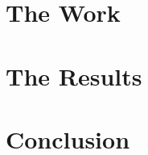 \documentclass{esda}
\begin{document}
\cleardoublepage
\section{The Work}
\label{sec:curr}


\cleardoublepage
\section{The Results}
\label{sec:res}


\cleardoublepage
\section{Conclusion}
\label{sec:conc}



\end{document}
